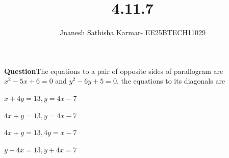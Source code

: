 \documentclass[journal]{IEEEtran}
\theoremstyle{remark}
\begin{document}
\setlength{\abovedisplayskip}{0pt}
\setlength{\belowdisplayskip}{0pt}
\setlength{\abovedisplayshortskip}{0pt}
\setlength{\belowdisplayshortskip}{0pt}

\onecolumn

\title{4.11.7}
\author{Jnanesh Sathisha Karmar- EE25BTECH11029}
\maketitle


\renewcommand{\thefigure}{\theenumi}
\renewcommand{\thetable}{\theenumi}
\textbf{Question}The equations to a pair of opposite sides of parallogram are $x^2 - 5x + 6 = 0$ and $y^2 - 6y + 5 = 0$, the equations to its diagonals are
\begin{enumerate}
\begin{multicols}{2}
    \item $x+4y=13,y=4x-7$
    \item $4x+y=13,y=4x-7$
    \item $4x+y=13,4y=x-7$
    \item $y-4x=13,y+4x=7$
\end{multicols}
\end{enumerate}
\end{document}
